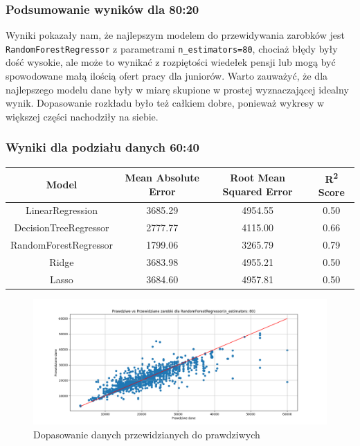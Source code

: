 \documentclass[a4paper]{article}
\begin{document}
\subsubsection{Podsumowanie wyników dla 80:20}

\quad Wyniki pokazały nam, że najlepszym modelem do przewidywania zarobków jest \texttt{RandomForestRegressor} z parametrami \texttt{n\_estimators=80},
chociaż błędy były dość wysokie, ale może to wynikać z rozpiętości wiedełek pensji lub mogą być spowodowane małą ilością ofert pracy dla juniorów. Warto zauważyć, że
dla najlepszego modelu dane były w miarę skupione w prostej wyznaczającej idealny wynik. Dopasowanie rozkładu było też całkiem dobre, ponieważ
wykresy w większej części nachodziły na siebie.


\subsubsection{Wyniki dla podziału danych 60:40}

\begin{table}[H]
    \centering
    \begin{tabular}{|c|c|c|c|}
        \hline
        \textbf{Model}        & \textbf{Mean Absolute Error} & \textbf{Root Mean Squared Error} & \textbf{R\textsuperscript{2} Score} \\ \hline
        LinearRegression      & 3685.29                      & 4954.55                          & 0.50                                \\ \hline
        DecisionTreeRegressor & 2777.77                      & 4115.00                          & 0.66                                \\ \hline
        RandomForestRegressor & 1799.06                      & 3265.79                          & 0.79                                \\ \hline
        Ridge                 & 3683.98                      & 4955.21                          & 0.50                                \\ \hline
        Lasso                 & 3684.60                      & 4957.81                          & 0.50                                \\ \hline
    \end{tabular}
\end{table}

\begin{figure}[H]
    \centering
    \includegraphics[width=\textwidth]{../analysis/plots/wyniki/0.6&0.4/RandomForestRegressor/scatter.png}
    \caption{Dopasowanie danych przewidzianych do prawdziwych}
\end{figure}
\end{document}
